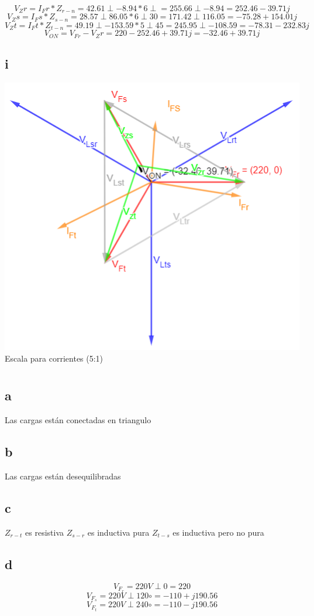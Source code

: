 \documentclass{article}
\begin{document}
\[V_Zr=I_Fr*Z_{r-n}=42.61\perp-8.94*6\perp=255.66\perp-8.94=252.46-39.71j\]
\[V_Zs=I_Fs*Z_{s-n}=28.57\perp86.05*6\perp30=171.42\perp116.05=-75.28+154.01j\]
\[V_Zt=I_Ft*Z_{t-n}=49.19\perp-153.59*5\perp45=245.95\perp-108.59=-78.31-232.83j\]
\[V_{ON}=V_{Fr}-V_Zr=220-252.46+39.71j=-32.46+39.71j\]
\subsection{i}
\includegraphics[scale=0.5]{diagrama_fasorial2.png}
Escala para corrientes (5:1)
\section{}
\subsection{a}
Las cargas están conectadas en triangulo
\subsection{b}
Las cargas están desequilibradas
\subsection{c}
$Z_{r-t}$ es resistiva
$Z_{s-r}$ es inductiva pura
$Z_{t-s}$ es inductiva pero no pura
\subsection{d}
\[V_F_r=220V\perp0=220\]
\[V_F_s=220V\perp120\circ=-110+j190.56\]
\[V_F_t=220V\perp240\circ=-110-j190.56\]
\end{document}
